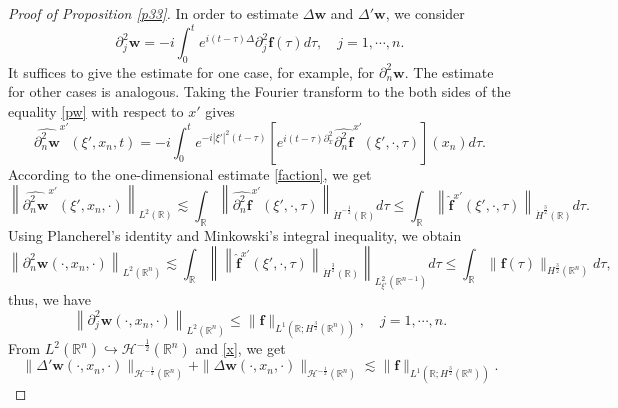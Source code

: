 \documentclass[preprint,compress,12pt]{elsarticle}
\numberwithin{equation}{section}
\begin{document}
\begin{proof}[Proof of Proposition \ref{p33}]
	In order to estimate $\Delta \boldsymbol{w}$ and $\Delta' \boldsymbol{w}$, we consider
	\begin{equation}\label{pw}
		\partial_{j}^{2} \boldsymbol{w} =-i\int_{0}^{t}e^{i(t-\tau)\Delta} \partial_{j}^{2}\boldsymbol{f}(\tau)d\tau,\quad j=1,\cdots,n.
	\end{equation}
	It suffices to give the estimate for one case, for example, for $\partial_{n}^{2}\boldsymbol{w}$. The estimate for other cases is analogous.
	Taking the Fourier transform to the both sides of the equality \eqref{pw} with respect to $x'$ gives
	\begin{equation}\label{star}	\widehat{\partial_{n}^{2}\boldsymbol{w}}^{x'}(\xi',x_{n},t)=-i\int_{0}^{t}e^{-i|\xi'|^{2}(t-\tau)}\left[e^{i(t-\tau)\partial_{x}^{2}}\widehat{\partial_{n}^{2}\boldsymbol{f}}^{x'}(\xi',\cdot,\tau)\right](x_{n}) d\tau.
	\end{equation}
	According to the one-dimensional estimate \eqref{faction}, we get
	\begin{equation*} \left\|\widehat{\partial_{n}^{2}\boldsymbol{w}}^{x'}(\xi',x_{n},\cdot)\right\|_{L^{2}(\mathbb{R})}\lesssim \int_{\mathbb{R}} \left\|\widehat{\partial_{n}^{2}\boldsymbol{f}}^{x'}(\xi',\cdot,\tau)\right\|_{\dot{H}^{-\frac{1}{2}}(\mathbb{R})}d\tau\leq\int_{\mathbb{R}} \left\|\widehat{\boldsymbol{f}}^{x'}(\xi',\cdot,\tau)\right\|_{\dot{H}^{\frac{3}{2}}(\mathbb{R})}d\tau.
	\end{equation*}
	Using  Plancherel's identity and Minkowski's integral inequality, we obtain
	\begin{equation*}		\left\|\partial_{n}^{2}\boldsymbol{w}(\cdot,x_{n},\cdot)\right\|_{L^{2}(\mathbb{R}^{n})}\lesssim\int_{\mathbb{R}}\left\|\left\|\widehat{\boldsymbol{f}}^{x'}(\xi',\cdot,\tau)\right\|_{\dot{H}^{\frac{3}{2}}(\mathbb{R})}\right\|_{L^{2}_{\xi'}(\mathbb{R}^{n-1})}d\tau\leq\int_{\mathbb{R}}\|\boldsymbol{f}(\tau)\|_{H^{\frac{3}{2}}(\mathbb{R}^{n})}d\tau,
	\end{equation*}
	thus, we have
	\begin{equation}\label{x} \left\|\partial_{j}^{2}\boldsymbol{w}(\cdot,x_{n},\cdot)\right\|_{L^{2}(\mathbb{R}^{n})}\leq\|\boldsymbol{f}\|_{L^{1}(\mathbb{R};H^{\frac{3}{2}}(\mathbb{R}^{n}))},\quad j=1,\cdots,n.
	\end{equation}
	From $L^{2}(\mathbb{R}^{n})\hookrightarrow\mathcal{H}^{-\frac{1}{2}}(\mathbb{R}^{n})$ and \eqref{x}, we get
	\begin{equation}\label{del}		\|\Delta'\boldsymbol{w}(\cdot,x_{n},\cdot)\|_{\mathcal{H}^{-\frac{1}{2}}(\mathbb{R}^{n})}+\|\Delta\boldsymbol{w}(\cdot,x_{n},\cdot)\|_{\mathcal{H}^{-\frac{1}{2}}(\mathbb{R}^{n})}\lesssim\|\boldsymbol{f}\|_{L^{1}(\mathbb{R};H^{\frac{3}{2}}(\mathbb{R}^{n}))}.

\end{equation}
\end{proof}
\end{document}
